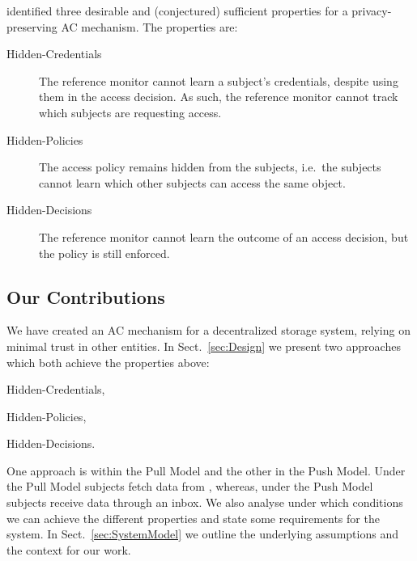 \citet{TowardsPPACwHPHCHD} identified three desirable and (conjectured) 
sufficient properties for a privacy-preserving \ac{AC} mechanism.
The properties are:
\begin{description}
  \item[Hidden-Credentials] The reference monitor cannot learn a subject's 
    credentials, despite using them in the access decision.
    As such, the reference monitor cannot track which subjects are requesting 
    access.

  \item[Hidden-Policies] The access policy remains hidden from the subjects, 
    i.e.\ the subjects cannot learn which other subjects can access the same 
    object.

  \item[Hidden-Decisions] The reference monitor cannot learn the outcome of an 
    access decision, but the policy is still enforced.

\end{description}

\subsection{Our Contributions}


We have created an \ac{AC} mechanism for a decentralized storage system, 
relying on minimal trust in other entities.
In Sect.~\ref{sec:Design} we present two approaches which both achieve the 
properties above:
\begin{inparablank}
\item Hidden-Credentials,
\item Hidden-Policies,
\item Hidden-Decisions.
\end{inparablank}
One approach is within the Pull Model and the other in the Push Model.
Under the Pull Model subjects fetch data from , whereas, under the 
Push Model subjects receive data through an inbox.
We also analyse under which conditions we can achieve the different properties 
and state some requirements for the system.
In Sect.~\ref{sec:SystemModel} we outline the underlying assumptions and the 
context for our work.

